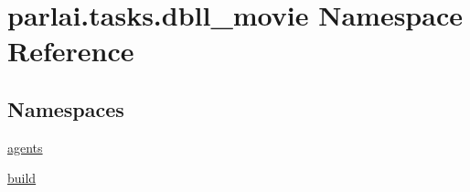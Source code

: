 \hypertarget{namespaceparlai_1_1tasks_1_1dbll__movie}{}\section{parlai.\+tasks.\+dbll\+\_\+movie Namespace Reference}
\label{namespaceparlai_1_1tasks_1_1dbll__movie}
\subsection*{Namespaces}
\begin{DoxyCompactItemize}
\item 
 \hyperlink{namespaceparlai_1_1tasks_1_1dbll__movie_1_1agents}{agents}
\item 
 \hyperlink{namespaceparlai_1_1tasks_1_1dbll__movie_1_1build}{build}
\end{DoxyCompactItemize}
